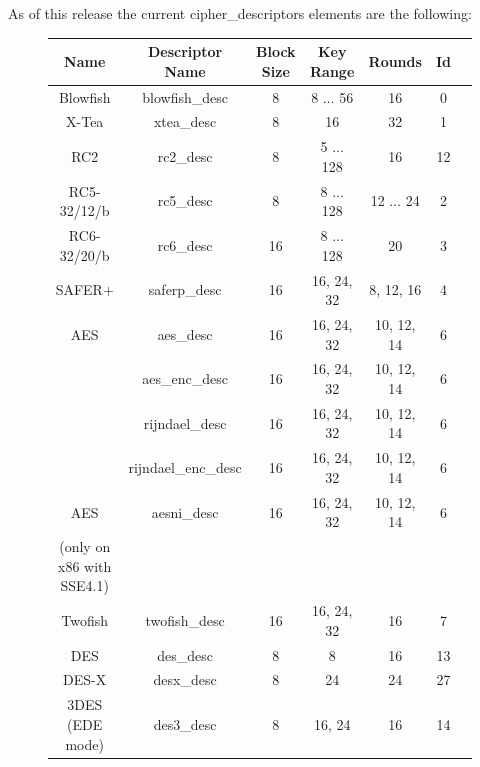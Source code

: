 \documentclass[synpaper]{book}
\begin{document}
As of this release the current cipher\_descriptors elements are the following:
\vfil
{}
       
         
    
\begin{figure}[hpbt]
\begin{small}
\begin{center}
\begin{tabular}{|c|c|c|c|c|c|c|}
     \hline \textbf{Name} & \textbf{Descriptor Name} & \textbf{Block Size} & \textbf{Key Range} & \textbf{Rounds} & \textbf{Id} \\
     \hline Blowfish & blowfish\_desc & 8 & 8 $\ldots$ 56 & 16 & 0 \\
     \hline X-Tea & xtea\_desc & 8 & 16 & 32 & 1 \\
     \hline RC2 & rc2\_desc & 8 & 5 $\ldots$ 128 & 16 & 12 \\
     \hline RC5-32/12/b & rc5\_desc & 8 & 8 $\ldots$ 128 & 12 $\ldots$ 24 & 2 \\
     \hline RC6-32/20/b & rc6\_desc & 16 & 8 $\ldots$ 128 & 20 & 3 \\
     \hline SAFER+ & saferp\_desc &16 & 16, 24, 32 & 8, 12, 16 & 4 \\
     \hline AES & aes\_desc & 16 & 16, 24, 32 & 10, 12, 14 & 6 \\
                & aes\_enc\_desc & 16 & 16, 24, 32 & 10, 12, 14 & 6 \\
                & rijndael\_desc & 16 & 16, 24, 32 & 10, 12, 14 & 6 \\
                & rijndael\_enc\_desc & 16 & 16, 24, 32 & 10, 12, 14 & 6 \\
     \hline AES & aesni\_desc & 16 & 16, 24, 32 & 10, 12, 14 & 6 \\
            (only on x86 with SSE4.1) &&&&& \\
     \hline Twofish & twofish\_desc & 16 & 16, 24, 32 & 16 & 7 \\
     \hline DES & des\_desc & 8 & 8 & 16 & 13 \\
     \hline DES-X & desx\_desc & 8 & 24 & 24 & 27 \\
     \hline 3DES (EDE mode) & des3\_desc & 8 & 16, 24 & 16 & 14 \\

\end{tabular}
\end{center}
\end{small}
\end{figure}
\end{document}
